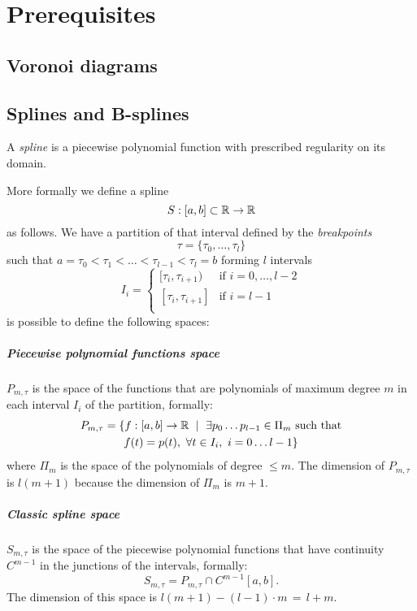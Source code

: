 \documentclass[dissertation.tex]{subfiles}
\begin{document}
\chapter{Prerequisites}
\section{Voronoi diagrams}
\section{Splines and B-splines}\label{sec:spline}
A \emph{spline} is a piecewise polynomial function with prescribed
regularity on its domain.

More formally we define a spline
$$S:[a,b]\subset\mathbb{R}\rightarrow\mathbb{R}$$
as follows.
We have a partition of that interval defined by the \emph{breakpoints}
$$\tau = \{\tau_0,\dots,\tau_l\}$$
such that $a=\tau_0<\tau_1<\dots<\tau_{l-1}<\tau_l=b$ forming $l$
intervals
$$
I_i=
\begin{cases}
  [\tau_i,\tau_{i+1}) & \mbox{if } i=0,\dots,l-2\\
    [\tau_i,\tau_{i+1}] & \mbox{if } i=l-1\\
\end{cases}
$$
is possible to define the following spaces:
\paragraph{Piecewise polynomial functions space} $P_{m,\tau}$
is the space of the functions that are polynomials of maximum degree $m$
in each interval $I_i$ of the partition, formally:
\begin{multline*}
  P_{m,\tau}=\{f:[a,b]\rightarrow\mathbb{R}\ \mid\ \exists p_0\dots
  p_{l-1}\in\Pi_m \ \text{such that}\\
  f(t)=p(t),\ \forall t\in I_i,\
  i=0\dots l-1\}
\end{multline*}
where $\Pi_m$ is the space of the polynomials of degree $\le m$. The
dimension of $P_{m,\tau}$ is $l(m+1)$ because the dimension of $\Pi_m$
is $m+1$.
\paragraph{Classic spline space} $S_{m,\tau}$ is the space of
the piecewise polynomial functions that have continuity $C^{m-1}$ in
the junctions of the intervals, formally:
$$
S_{m,\tau}=P_{m,\tau}\cap C^{m-1}[a,b].
$$
The dimension of this space is $l(m+1)-(l-1)\cdot m\,=\,l+m$.
\end{document}
